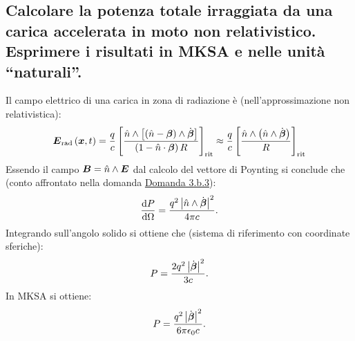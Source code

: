 \subsection[]{Calcolare la potenza totale irraggiata da una carica accelerata in moto non relativistico. Esprimere i risultati in MKSA e nelle unità “naturali”.}
\label{sec:3.b.14}
Il campo elettrico di una carica in zona di radiazione è (nell'approssimazione non relativistica):
\[
	\boldsymbol{E}_{\text{rad}}\left( \boldsymbol{x},t \right)= \frac{q}{c} \left[ \frac{\hat{n}\wedge \left[ \left( \hat{n}-\boldsymbol{\beta} \right) \wedge \dot{\boldsymbol{\beta}}  \right] }
	{\left( 1-\hat{n}\cdot \boldsymbol{\beta} \right) R}  \right]_{\text{rit}}  \approx \frac{q}{c}\left[ \frac{\hat{n}\wedge \left(\hat{n}\wedge \dot{\boldsymbol{\beta}}\right)}{R}\right]_{\text{rit}} 
\]
Essendo il campo $\boldsymbol{B}=\hat{n}\wedge \boldsymbol{E}$ dal calcolo del vettore di Poynting si conclude che (conto affrontato nella domanda \hyperref[sec:3.b.3]{Domanda 3.b.3}):
\[
	\frac{\mbox{d} P}{\mbox{d} \Omega} = \frac{q^2\left| \hat{n}\wedge \dot{\boldsymbol{\beta}}\right|^2}{4\pi c}
.\] 
Integrando sull'angolo solido si ottiene che (sistema di riferimento con coordinate sferiche):
\[
	P = \frac{2q^2\left| \dot{\boldsymbol{\beta}} \right|^2}{3c}
.\] 
In MKSA si ottiene:
\[
	P = \frac{q^2\left| \dot{\boldsymbol{\beta}} \right|^2}{6\pi\epsilon_0c}
.\] 

